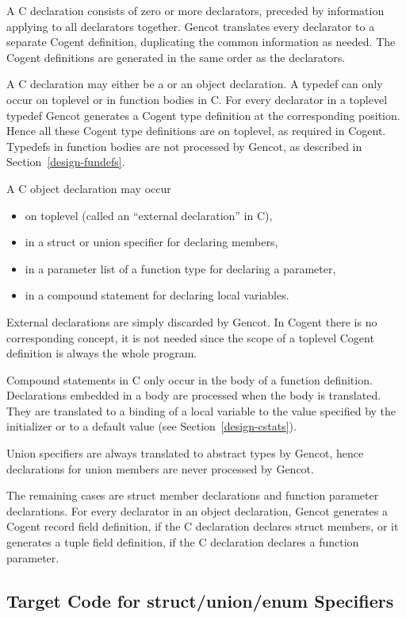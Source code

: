 
A C declaration consists of zero or more declarators, preceded by information applying to all declarators together.
Gencot translates every declarator to a separate Cogent definition, duplicating the common information as needed.
The Cogent definitions are generated in the same order as the declarators.

A C declaration may either be a  or an object declaration. A typedef can only occur on toplevel or 
in function bodies in C.
For every declarator in a toplevel typedef Gencot generates a Cogent type definition at the corresponding position. Hence
all these Cogent type definitions are on toplevel, as required in Cogent. Typedefs in function bodies are not
processed by Gencot, as described in Section~\ref{design-fundefs}.

A C object declaration may occur 
\begin{itemize}
\item on toplevel (called an ``external declaration'' in C),
\item in a struct or union specifier for declaring members,
\item in a parameter list of a function type for declaring a parameter,
\item in a compound statement for declaring local variables.
\end{itemize}

External declarations are simply discarded by Gencot. In Cogent there is no corresponding concept, it is not needed
since the scope of a toplevel Cogent definition is always the whole program. 

Compound statements in C only occur 
in the body of a function definition. Declarations embedded in a body are processed when the body is translated. They
are translated to a binding of a local variable to the value specified by the initializer or to a default value (see
Section~\ref{design-cstats}).

Union specifiers are always translated to abstract types by Gencot, hence declarations for union members are
never processed by Gencot.

The remaining cases are struct member declarations and function parameter declarations. 
For every declarator in an object declaration, Gencot generates a Cogent record field definition, if the C declaration
declares struct members, or it generates a tuple field definition, if the C declaration declares a function parameter.

\subsection{Target Code for struct/union/enum Specifiers}
\label{design-decls-tags}

